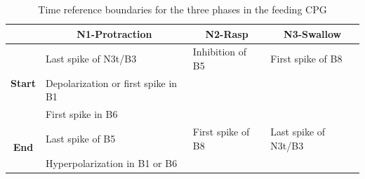 \begin{table}[htb!]
	\centering
	\begin{tabular}{cl|l|l}
			\multicolumn{1}{l}{}                                 & \multicolumn{1}{c|}{\textbf{N1-Protraction}} & \multicolumn{1}{c|}{\textbf{N2-Rasp}} & \multicolumn{1}{c}{\textbf{N3-Swallow}} \\ \hline
			\multicolumn{1}{c|}{\multirow{3}{*}{\textbf{Start}}} & Last spike of N3t/B3                         & Inhibition of B5                      & First spike of B8                       \\
			\multicolumn{1}{c|}{}                                & Depolarization or first spike in B1          &                                       &                                         \\
			\multicolumn{1}{c|}{}                                & First spike in B6                            &                                       &                                         \\ \hline
			\multicolumn{1}{c|}{\multirow{2}{*}{\textbf{End}}}   & Last spike of B5                             & First spike of B8                     & Last spike of N3t/B3                    \\
			\multicolumn{1}{c|}{}                                & Hyperpolarization in B1 or B6                &                                       &                                        
		\end{tabular}
	\caption{Time reference boundaries for the three phases in the feeding CPG}
	\label{table:cpg ref intervals}
\end{table}


